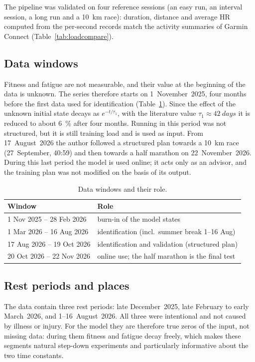 \documentclass[11pt,a4paper]{article}
\begin{document}
The pipeline was validated on four reference sessions (an easy run, an interval
session, a long run and a \SI{10}{km} race): duration, distance and average HR
computed from the per-second records match the activity summaries of Garmin
Connect (Table~\ref{tab:loadcompare}).

\subsection{Data windows}
Fitness and fatigue are not measurable, and their value at the beginning of
the data is unknown. The series therefore starts on 1~November~2025, four
months before the first data used for identification (Table~\ref{tab:windows}).
Since the effect of the unknown initial state decays as $e^{-t/\tau_1}$, with
the literature value $\tau_1 \approx \SI{42}{days}$ it is reduced to about
\SI{6}{\percent} after four months. Running in this period was not structured,
but it is still training load and is used as input. From 17~August~2026 the
author followed a structured plan towards a \SI{10}{km} race (27~September,
40:59) and then towards a half marathon on 22~November~2026. During this last
period the model is used online; it acts only as an advisor, and the training
plan was not modified on the basis of its output.

\begin{table}[ht]
\centering
\caption{Data windows and their role.}\label{tab:windows}
\begin{tabular}{@{}ll@{}}
\toprule
Window & Role \\
\midrule
1 Nov 2025 -- 28 Feb 2026 & burn-in of the model states \\
1 Mar 2026 -- 16 Aug 2026 & identification (incl.\ summer break 1--16 Aug) \\
17 Aug 2026 -- 19 Oct 2026 & identification and validation (structured plan) \\
20 Oct 2026 -- 22 Nov 2026 & online use; the half marathon is the final test \\
\bottomrule
\end{tabular}
\end{table}

\subsection{Rest periods and places}
The data contain three rest periods: late December~2025, late February to
early March~2026, and 1--16~August~2026. All three were intentional and not
caused by illness or injury. For the model they are therefore true zeros of the
input, not missing data: during them fitness and fatigue decay freely, which
makes these segments natural step-down experiments and particularly
informative about the two time constants.
\end{document}
